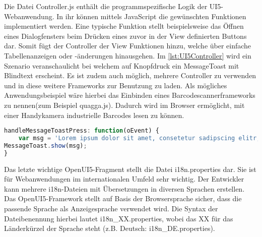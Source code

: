 Die Datei Controller.js enthält die programmspezifische Logik der UI5-Webanwendung. In ihr können mittels JavaScript die gewünschten Funktionen implementiert werden. Eine typische Funktion stellt beispielsweise das Öffnen eines Dialogfensters beim Drücken eines zuvor in der View definierten Buttons dar. Somit fügt der Controller der View Funktionen hinzu, welche über einfache Tabellenanzeigen oder -änderungen hinausgehen. Im \autoref{lst:UI5Controller} wird ein Szenario veranschaulicht bei welchem auf Knopfdruck ein MessageToast mit Blindtext erscheint. Es ist zudem auch möglich, mehrere Controller zu verwenden und in diese weitere Frameworks zur Benutzung zu laden. Als mögliches Anwendungsbeispiel wäre hierbei das Einbinden eines Barcodescannerframeworks zu nennen(zum Beispiel quagga.js). Dadurch wird im Browser ermöglicht, mit einer Handykamera industrielle Barcodes lesen zu können. 

\begin{lstlisting}[caption=Beispiel OpenUI5 Controller, label=lst:UI5Controller, language=Javascript]
handleMessageToastPress: function(oEvent) {
	var msg = 'Lorem ipsum dolor sit amet, consetetur sadipscing elitr, sed diam nonumy\r\n eirmod.';
MessageToast.show(msg);
}
\end{lstlisting}

Das letzte wichtige OpenUI5-Fragment stellt die Datei i18n.properties dar. Sie ist für Webanwendungen im internationalen Umfeld sehr wichtig. Der Entwickler kann mehrere i18n-Dateien mit Übersetzungen in diversen Sprachen erstellen. Das OpenUI5-Framework stellt auf Basis der Browsersprache sicher, dass die passende Sprache als Anzeigesprache verwendet wird. Die Syntax der Dateibenennung hierbei lautet i18n\_XX.properties, wobei das XX für das Länderkürzel der Sprache steht (z.B. Deutsch: i18n\_DE.properties).\autocites[vgl.][126\psqq]{Antolovic2014}
